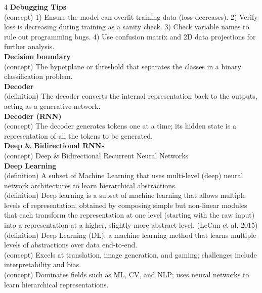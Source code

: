 \documentclass[8pt]{extarticle}
\begin{document}
\begin{multicols}{4}
\vspace{2pt}\textbf{Debugging Tips}\\
(concept) 1) Ensure the model can overfit training data (loss decreases). 2) Verify loss is decreasing during training as a sanity check. 3) Check variable names to rule out programming bugs. 4) Use confusion matrix and 2D data projections for further analysis.\\
\vspace{2pt}\textbf{Decision boundary}\\
(concept) The hyperplane or threshold that separates the classes in a binary classification problem.\\
\vspace{2pt}\textbf{Decoder}\\
(definition) The decoder converts the internal representation back to the outputs, acting as a generative network.\\
\vspace{2pt}\textbf{Decoder (RNN)}\\
(concept) The decoder generates tokens one at a time; its hidden state is a representation of all the tokens to be generated.\\
\vspace{2pt}\textbf{Deep \& Bidirectional RNNs}\\
(concept) Deep \& Bidirectional Recurrent Neural Networks\\
\vspace{2pt}\textbf{Deep Learning}\\
(definition) A subset of Machine Learning that uses multi-level (deep) neural network architectures to learn hierarchical abstractions.\\
(definition) Deep learning is a subset of machine learning that allows multiple levels of representation, obtained by composing simple but non-linear modules that each transform the representation at one level (starting with the raw input) into a representation at a higher, slightly more abstract level. (LeCun et al. 2015)\\
(definition) Deep Learning (DL): a machine learning method that learns multiple levels of abstractions over data end-to-end.\\
(concept) Excels at translation, image generation, and gaming; challenges include interpretability and bias.\\
(concept) Dominates fields such as ML, CV, and NLP; uses neural networks to learn hierarchical representations.\\


\end{multicols}
\end{document}
